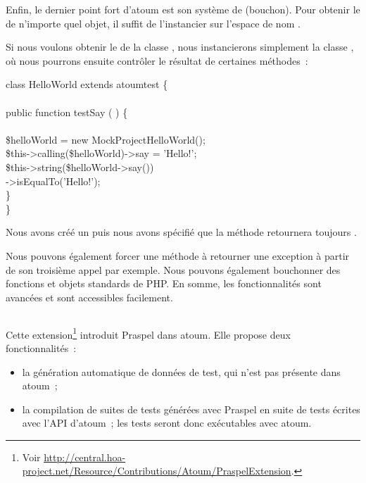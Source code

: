 Enfin, le dernier point fort d'atoum est son système de 
(bouchon). Pour obtenir le  de n'importe quel objet, il suffit
de l'instancier sur l'espace de nom .

\begin{example}

Si nous voulons obtenir le  de la classe
, nous instancierons simplement la classe
, où nous pourrons ensuite
contrôler le résultat de certaines méthodes~:
%
\begin{pre}
class HelloWorld extends \bslash{}atoum\bslash{}test \{ \\
 \\
    public function testSay ( ) \{ \\
 \\
        \$helloWorld = new \bslash{}Mock\bslash{}Project\bslash{}HelloWorld(); \\
        \$this->calling(\$helloWorld)->say = 'Hello!'; \\
        \$this->string(\$helloWorld->say()) \\
                  ->isEqualTo('Hello!'); \\
    \} \\
\}
\end{pre}
%
Nous avons créé un  puis nous avons spécifié que la méthode
 retournera toujours .

\end{example}

Nous pouvons également forcer une méthode à retourner une exception à partir de
son troisième appel par exemple. Nous pouvons également bouchonner des fonctions
et objets standards de PHP. En somme, les fonctionnalités sont avancées et sont
accessibles facilement.

\subsection{}

Cette extension\footnote{Voir
\url{http://central.hoa-project.net/Resource/Contributions/Atoum/PraspelExtension}.}
introduit Praspel dans atoum. Elle propose deux fonctionnalités~:
%
\begin{itemize}

\item la génération automatique de données de test, qui n'est pas présente dans
atoum~;

\item la compilation de suites de tests générées avec Praspel en suite de tests
écrites avec l'API d'atoum~; les tests seront donc exécutables avec atoum.

\end{itemize}

